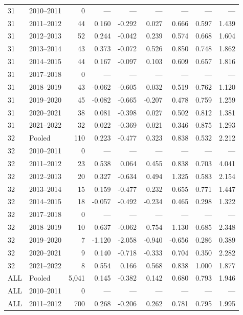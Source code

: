 \begin{longtable}{llrrrrrrr}
31 & 2010--2011 & 0 & --- & --- & --- & --- & --- & --- \\
31 & 2011--2012 & 44 & 0.160 & -0.292 & 0.027 & 0.666 & 0.597 & 1.439 \\
31 & 2012--2013 & 52 & 0.244 & -0.042 & 0.239 & 0.574 & 0.668 & 1.604 \\
31 & 2013--2014 & 43 & 0.373 & -0.072 & 0.526 & 0.850 & 0.748 & 1.862 \\
31 & 2014--2015 & 44 & 0.167 & -0.097 & 0.103 & 0.609 & 0.657 & 1.816 \\
31 & 2017--2018 & 0 & --- & --- & --- & --- & --- & --- \\
31 & 2018--2019 & 43 & -0.062 & -0.605 & 0.032 & 0.519 & 0.762 & 1.120 \\
31 & 2019--2020 & 45 & -0.082 & -0.665 & -0.207 & 0.478 & 0.759 & 1.259 \\
31 & 2020--2021 & 38 & 0.081 & -0.398 & 0.027 & 0.502 & 0.812 & 1.381 \\
31 & 2021--2022 & 32 & 0.022 & -0.369 & 0.021 & 0.346 & 0.875 & 1.293 \\
32 & Pooled & 110 & 0.223 & -0.477 & 0.323 & 0.838 & 0.532 & 2.212 \\
32 & 2010--2011 & 0 & --- & --- & --- & --- & --- & --- \\
32 & 2011--2012 & 23 & 0.538 & 0.064 & 0.455 & 0.838 & 0.703 & 4.041 \\
32 & 2012--2013 & 20 & 0.327 & -0.634 & 0.494 & 1.325 & 0.583 & 2.154 \\
32 & 2013--2014 & 15 & 0.159 & -0.477 & 0.232 & 0.655 & 0.771 & 1.447 \\
32 & 2014--2015 & 18 & -0.057 & -0.492 & -0.234 & 0.465 & 0.298 & 1.322 \\
32 & 2017--2018 & 0 & --- & --- & --- & --- & --- & --- \\
32 & 2018--2019 & 10 & 0.637 & -0.062 & 0.754 & 1.130 & 0.685 & 2.348 \\
32 & 2019--2020 & 7 & -1.120 & -2.058 & -0.940 & -0.656 & 0.286 & 0.389 \\
32 & 2020--2021 & 9 & 0.140 & -0.718 & -0.333 & 0.704 & 0.350 & 2.282 \\
32 & 2021--2022 & 8 & 0.554 & 0.166 & 0.568 & 0.838 & 1.000 & 1.877 \\
ALL & Pooled & 5,041 & 0.145 & -0.382 & 0.142 & 0.680 & 0.793 & 1.946 \\
ALL & 2010--2011 & 0 & --- & --- & --- & --- & --- & --- \\
ALL & 2011--2012 & 700 & 0.268 & -0.206 & 0.262 & 0.781 & 0.795 & 1.995 \\

\end{longtable}
